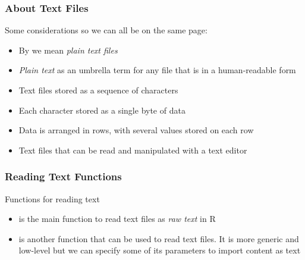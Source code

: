 \documentclass{beamer}\usepackage[]{graphicx}\usepackage[]{color}
\begin{document}

\begin{frame}
\frametitle{About Text Files}

Some considerations so we can all be on the same page:
\begin{itemize}
 \item By  we mean \textit{plain text files} \\
 \item \textit{Plain text} as an umbrella term for any file that is in a human-readable form 
 \item Text files stored as a sequence of characters 
 \item Each character stored as a single byte of data
 \item Data is arranged in rows, with several values stored on each row
 \item Text files that can be read and manipulated with a text editor
\end{itemize}

\end{frame}


\begin{frame}
\frametitle{Reading Text Functions}

\begin{block}{Functions for reading text}
\begin{itemize}
 \item {} is the main function to read text files as \textit{raw text} in R
 \item {} is another function that can be used to read text files. It is more generic and low-level but we can specify some of its parameters to import content as text
\end{itemize}
\end{block}

\end{frame}

\end{document}
